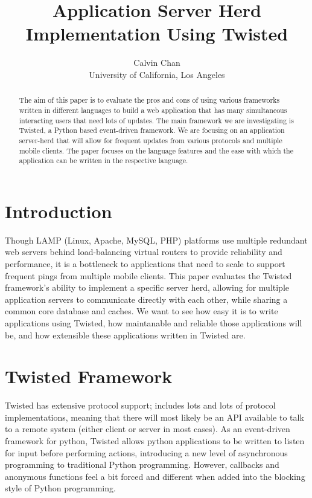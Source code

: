 \documentclass[letterpaper,twocolumn,10pt]{article}
\begin{document}
\date{}

\title{\Large \bf Application Server Herd Implementation Using Twisted}

\author{
{\rm Calvin Chan} \\
University of California, Los Angeles
}

\maketitle

\begin{abstract}

The aim of this paper is to evaluate the pros and cons of using various frameworks written in different languages to build a web application that has many simultaneous interacting users that need lots of updates. The main framework we are investigating is Twisted, a Python based event-driven framework. We are focusing on an application server-herd that will allow for frequent updates from various protocols and multiple mobile clients. The paper focuses on the language features and the ease with which the application can be written in the respective language.
\end{abstract}

\section{Introduction}
Though LAMP (Linux, Apache, MySQL, PHP) platforms use multiple redundant web servers behind load-balancing virtual routers to provide reliability and performance, it is a bottleneck to applications that need to scale to support frequent pings from multiple mobile clients. This paper evaluates the Twisted framework's ability to implement a specific server herd, allowing for multiple application servers to communicate directly with each other, while sharing a common core database and caches. We want to see how easy it is to write applications using Twisted, how maintanable and reliable those applications will be, and how extensible these applications written in Twisted are.

\section{Twisted Framework}
Twisted has extensive protocol support; includes lots and lots of protocol implementations, meaning that there will most likely be an API available to talk to a remote system (either client or server in most cases). As an event-driven framework for python, Twisted allows python applications to be written to listen for input before performing actions, introducing a new level of asynchronous programming to traditional Python programming. However, callbacks and anonymous functions feel a bit forced and different when added into the blocking style of Python programming. 
\end{document}
